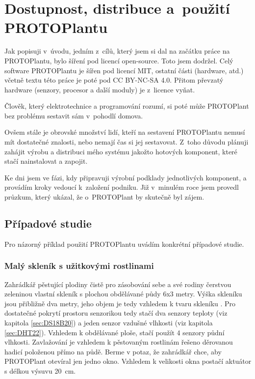 \chapter{Dostupnost, distribuce a~použití PROTOPlantu}
Jak popisuji v~úvodu, jedním z~cílů, který jsem si dal na začátku práce na PROTOPlantu, bylo šíření pod licencí open-source.
Toto jsem dodržel. 
Celý software PROTOPlantu je šířen pod licencí MIT, ostatní části (hardware, atd.) včetně textu této práce je poté pod CC BY-NC-SA 4.0.
Přitom převzatý hardware (senzory, procesor a další moduly) je z~licence vyňat.

Člověk, který elektrotechnice a programování rozumí, si poté může PROTOPlant bez problému sestavit sám v~pohodlí domova.

Ovšem stále je obrovské množství lidí, kteří na sestavení PROTOPlantu nemusí mít dostatečné znalosti, nebo nemají čas si jej sestavovat.
Z~toho důvodu plánuji zahájit výrobu a distribuci mého systému jakožto hotových komponent, které stačí nainstalovat a zapojit.

Ke dni  jsem ve fázi, kdy připravuji výrobní podklady jednotlivých komponent, a provádím kroky vedoucí k~založení podniku.
Již v~minulém roce jsem provedl průzkum, který ukázal, že o~PROTOPlant by skutečně byl zájem.

\section{Případové studie}
Pro názorný příklad použití PROTOPlantu uvádím konkrétní případové studie.

\subsection{Malý skleník s užitkovými rostlinami}
Zahrádkář pěstující plodiny čistě pro zásobování sebe a své rodiny čerstvou zeleninou vlastní skleník s plochou obdělávané půdy 6x3 metry.
Výška skleníku jsou přibližně dva metry, jeho objem je tedy vzhledem k tvaru skleníku .
Pro dostatečné pokrytí prostoru senzorikou tedy stačí dva senzory teploty (viz kapitola \ref{sec:DS18B20}) a jeden senzor vzdušné vlhkosti (viz kapitola \ref{sec:DHT22}). 
Vzhledem k obdělávané ploše, stačí použít 4 senzory půdní vlhkosti.
Zavlažování je vzhledem k pěstovaným rostlinám řešeno děrovanou hadicí položenou přímo na půdě.
Berme v potaz, že zahrádkář chce, aby PROTOPlant otevíral jen jedno okno.
Vzhledem k velikosti okna postačí aktuátor s délkou výsuvu 20~cm.

